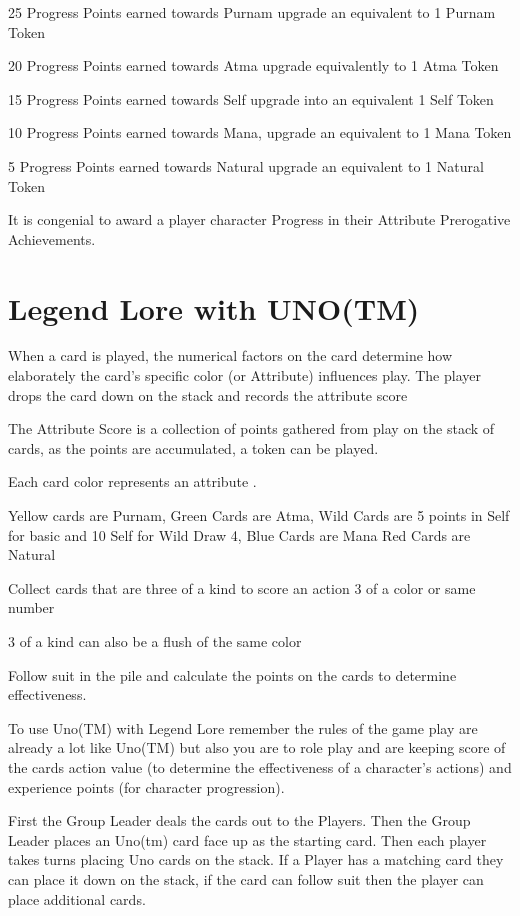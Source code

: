 \documentclass{article}
\begin{document}
25 Progress Points earned towards Purnam upgrade an equivalent to 1 Purnam Token

20 Progress Points earned towards Atma upgrade equivalently to 1 Atma Token

15 Progress Points earned towards Self upgrade into an equivalent 1 Self Token

10 Progress Points earned towards Mana, upgrade an equivalent to 1 Mana Token

5 Progress Points earned towards Natural upgrade an equivalent to 1 Natural Token

It is congenial to award a player character Progress in their Attribute Prerogative Achievements.

\section{Legend Lore with UNO(TM)}

When a card is played, the numerical factors on the card determine how elaborately the card's specific color (or Attribute) influences play. The player drops the card down on the stack and records the attribute score

The Attribute Score is a collection of points gathered from play on the stack of cards, as the points are accumulated, a token can be played.

Each card color represents an attribute .

Yellow cards are Purnam, Green Cards are Atma, Wild Cards are 5 points in Self for basic and 10 Self for Wild Draw 4, Blue Cards are Mana Red Cards are Natural

Collect cards that are three of a kind to score an action 3 of a color or same number

3 of a kind can also be a flush of the same color

Follow suit in the pile and calculate the points on the cards to determine effectiveness.

To use Uno(TM) with Legend Lore remember the rules of the game play are already a lot like Uno(TM) but also you are to role play and are keeping score of the cards action value (to determine the effectiveness of a character's actions) and experience points (for character progression).

First the Group Leader deals the cards out to the Players. Then the Group Leader places an Uno(tm) card face up as the starting card. Then each player takes turns placing Uno cards on the stack. If a Player has a matching card they can place it down  on the stack, if the card can follow suit then the player can place additional cards.
\end{document}

